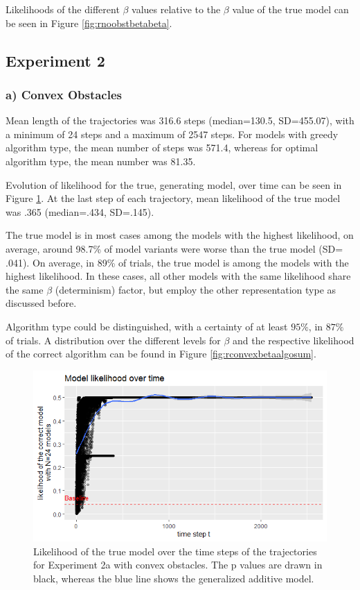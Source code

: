 Likelihoods of the different $\beta$ values relative to the $\beta$ value of the true model can be seen in Figure \ref{fig:rnoobstbetabeta}.



\subsection{Experiment 2}
\subsubsection*{a) Convex Obstacles}

Mean length of the trajectories was 316.6 steps (median=130.5, SD=455.07), with a minimum of 24 steps and a maximum of 2547 steps.
For models with greedy algorithm type, the mean number of steps was 571.4, whereas for optimal algorithm type, the mean number was 81.35.

Evolution of likelihood for the true, generating model, over time can be seen in Figure \ref{fig:rconvextlikelihoodall}. At the last step of each trajectory, mean likelihood of the true model was .365 (median=.434, SD=.145).

The true model is in most cases among the models with the highest likelihood, on average, around 98.7\% of model variants were worse than the true model (SD= .041).
On average, in 89\% of trials, the true model is among the models with the highest likelihood.
In these cases, all other models with the same likelihood share the same $\beta$ (determinism) factor, but employ the other representation type as discussed before.


Algorithm type could be distinguished, with a certainty of at least $95\%$, in $87\%$ of trials.
A distribution over the different levels for $\beta$ and the respective likelihood of the correct algorithm can be found in Figure \ref{fig:rconvexbetaalgosum}.


\begin{figure}
	\centering
	\includegraphics[width=0.95\linewidth]{../../statistics/R_convex_t_likelihoodall_points}
	\caption{Likelihood of the true model over the time steps of the trajectories for Experiment 2a with convex obstacles. The p values are drawn in black, whereas the blue line shows the generalized additive model.}
	\label{fig:rconvextlikelihoodall}
\end{figure}

